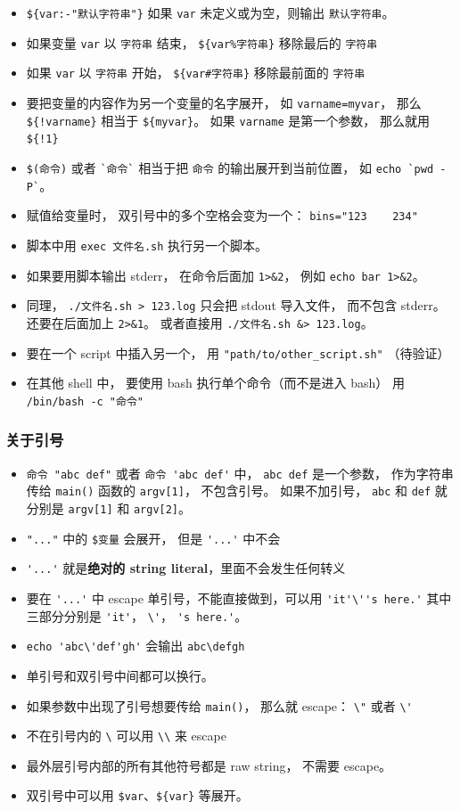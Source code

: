 \begin{itemize}
\item \verb`${var:-"默认字符串"}` 如果 \verb`var` 未定义或为空，则输出 \verb`默认字符串`。
\item 如果变量 \verb`var` 以 \verb`字符串` 结束， \verb`${var%字符串}` 移除最后的 \verb`字符串`
\item 如果 \verb`var` 以 \verb`字符串` 开始， \verb`${var#字符串}` 移除最前面的 \verb`字符串`
\item 要把变量的内容作为另一个变量的名字展开， 如 \verb`varname=myvar`， 那么 \verb`${!varname}` 相当于 \verb`${myvar}`。 如果 \verb`varname` 是第一个参数， 那么就用 \verb`${!1}`
\item \verb`$(命令)` 或者 \verb|`命令`| 相当于把 \verb`命令` 的输出展开到当前位置， 如 \verb|echo `pwd -P`|。
\item 赋值给变量时， 双引号中的多个空格会变为一个： \verb`bins="123    234"`
\item 脚本中用 \verb`exec 文件名.sh` 执行另一个脚本。
\item 如果要用脚本输出 stderr， 在命令后面加 \verb`1>&2`， 例如 \verb`echo bar 1>&2`。
\item 同理， \verb`./文件名.sh > 123.log` 只会把 stdout 导入文件， 而不包含 stderr。 还要在后面加上 \verb`2>&1`。 或者直接用 \verb`./文件名.sh &> 123.log`。
\item 要在一个 script 中插入另一个， 用 \verb`"path/to/other_script.sh"` （待验证）
\item 在其他 shell 中， 要使用 bash 执行单个命令（而不是进入 bash） 用 \verb`/bin/bash -c "命令"`
\end{itemize}

\subsubsection{关于引号}
\begin{itemize}
\item \verb`命令 "abc def"` 或者 \verb`命令 'abc def'` 中， \verb`abc def` 是一个参数， 作为字符串传给 \verb`main()` 函数的 \verb`argv[1]`， 不包含引号。 如果不加引号， \verb`abc` 和 \verb`def` 就分别是 \verb`argv[1]` 和 \verb`argv[2]`。
\item \verb`"..."` 中的 \verb`$变量` 会展开， 但是 \verb`'...'` 中不会
\item \verb`'...'` 就是\textbf{绝对的 string literal}，里面不会发生任何转义
\item 要在 \verb`'...'` 中 escape 单引号，不能直接做到，可以用 \verb`'it'\''s here.'` 其中三部分分别是 \verb`'it'`， \verb`\'`， \verb`'s here.'`。
\item \verb`echo 'abc\'def'gh'` 会输出 \verb`abc\defgh`
\item 单引号和双引号中间都可以换行。
\item 如果参数中出现了引号想要传给 \verb`main()`， 那么就 escape： \verb`\"` 或者 \verb`\'`
\item 不在引号内的 \verb`\` 可以用 \verb`\\` 来 escape
\item 最外层引号内部的所有其他符号都是 raw string， 不需要 escape。
\item 双引号中可以用 \verb`$var`、\verb`${var}` 等展开。
\end{itemize}

